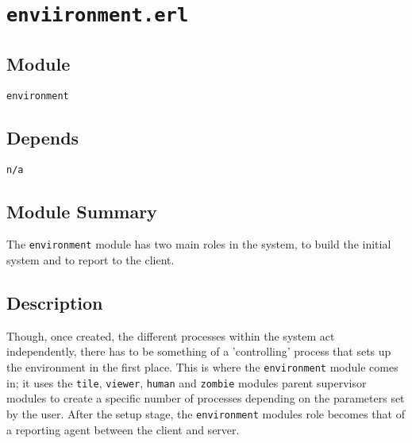 \pagestyle{empty}
\section{\tt enviironment.erl}
\subsection{Module}
\verb+environment+
\subsection{Depends}
{\tt n/a}
\subsection{Module Summary}
The \verb+environment+ module has two main roles in the system, to build the initial system and to report to the client.
\subsection{Description}
Though, once created, the different processes within the system act independently, there has to be something of a 'controlling' process that sets up the environment in the first place. This is where the \verb+environment+ module comes in; it uses the \verb+tile+, \verb+viewer+, \verb+human+ and \verb+zombie+ modules parent supervisor modules to create a specific number of processes depending on the parameters set by the user.
After the setup stage, the \verb+environment+ modules role becomes that of a reporting agent between the client and server.
